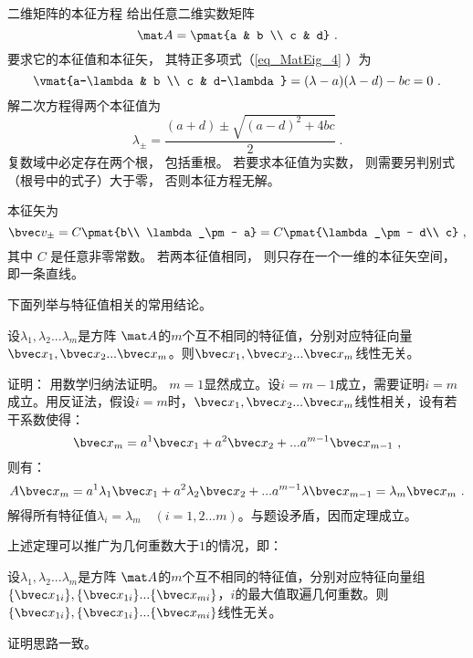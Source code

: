 \begin{example}{二维矩阵的本征方程}
给出任意二维实数矩阵
\begin{equation}
\mat A = \pmat{a & b \\ c & d}~.
\end{equation}
要求它的本征值和本征矢， 其特正多项式（\autoref{eq_MatEig_4} ）为
\begin{equation}
\vmat{a-\lambda & b \\ c & d-\lambda} = (\lambda-a)(\lambda-d) - bc = 0~.
\end{equation}
解二次方程得两个本征值为
\begin{equation}
\lambda_\pm = \frac{(a + d) \pm \sqrt{(a-d)^2 + 4bc}}{2}~.
\end{equation}
复数域中必定存在两个根， 包括重根。 若要求本征值为实数， 则需要另判别式（根号中的式子）大于零， 否则本征方程无解。

本征矢为
\begin{equation}
\bvec v_\pm = C\pmat{b\\ \lambda_\pm - a} = C\pmat{\lambda_\pm - d\\ c}~,
\end{equation}
其中 $C$ 是任意非零常数。 若两本征值相同， 则只存在一个一维的本征矢空间， 即一条直线。
\end{example}
下面列举与特征值相关的常用结论。
\begin{theorem}{}\label{the_MatEig_2}
设$\lambda_1,\lambda_2...\lambda_m$是方阵 $\mat A$的$m$个互不相同的特征值，分别对应特征向量$\bvec x_1,\bvec x_2...\bvec x_m$。则$\bvec x_1,\bvec x_2...\bvec x_m$线性无关。
\end{theorem}
证明： 
用数学归纳法证明。
$m=1$显然成立。设$i=m-1$成立，需要证明$i=m$成立。用反证法，假设$i=m$时，$\bvec x_1,\bvec x_2...\bvec x_m$线性相关，设有若干系数使得：
\begin{equation}
\bvec x_m=a^1\bvec x_1+a^2\bvec x_2+...a^{m-1} \bvec x_{m-1}~,
\end{equation}
则有：
\begin{equation}
 A\bvec x_m=a^1\lambda_1\bvec x_1+a^2\lambda_2\bvec x_2+...a^{m-1}\lambda \bvec x_{m-1}=\lambda_m\bvec x_m~.
\end{equation}
解得所有特征值$\lambda_i=\lambda_m\quad (i=1,2...m)$。与题设矛盾，因而定理成立。

上述定理可以推广为几何重数大于$1$的情况，即：
\begin{corollary}{}\label{cor_MatEig_1}
设$\lambda_1,\lambda_2...\lambda_m$是方阵 $\mat A$的$m$个互不相同的特征值，分别对应特征向量组$\{\bvec x_{1i}\},\{\bvec x_{1i}\}...\{\bvec x_{mi}\}$，$i$的最大值取遍几何重数。则$\{\bvec x_{1i}\},\{\bvec x_{1i}\}...\{\bvec x_{mi}\}$线性无关。
\end{corollary}
证明思路一致。


